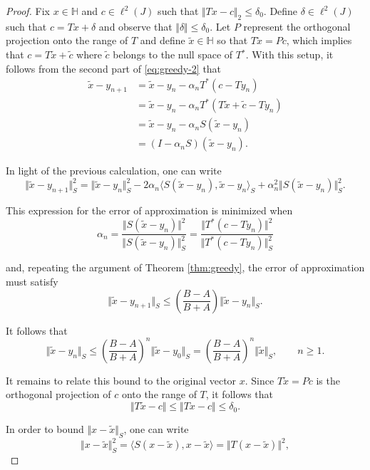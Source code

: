 \documentclass[11pt]{amsart}
\newcounter{Theorem}
\numberwithin{Theorem}{section}
\theoremstyle{definition}
\begin{document}
\begin{proof}
Fix $x\in \mathbb{H}$ and $c\in \ell^{2}(J)$ such that $\Vert Tx-c\Vert_{2} \le \delta_{0}$.  Define $\delta \in \ell^{2}(J)$ such that $c = Tx + \delta$ and observe that $\Vert \delta\Vert \le \delta_{0}$.  Let $P$ represent the orthogonal projection onto the range of $T$ and define $\tilde{x} \in \mathbb{H}$ so that $T\tilde{x}=Pc$, which implies that $c = T\tilde{x} + \tilde{c}$ where $\tilde{c}$ belongs to the null space of $T{^*}$.  With this setup, it follows from the second part of \eqref{eq:greedy-2} that
$$ \begin{aligned} 
    \tilde{x} - y_{n+1} &= \tilde{x} - y_{n} - \alpha_{n} T^{*}(c-T y_{n}) \\
                        &= \tilde{x} - y_{n} - \alpha_{n} T^{*}(T\tilde{x} + \tilde{c} - T y_{n}) \\
                        &= \tilde{x} - y_{n} - \alpha_{n} S(\tilde{x}-y_{n}) \\
                        &= (I-\alpha_{n}S) (\tilde{x}-y_{n}). 
    \end{aligned} $$

\noindent
In light of the previous calculation, one can write
$$ \Vert \tilde{x}-y_{n+1} \Vert_{S}^{2} = \Vert \tilde{x}-y_{n} \Vert_{S}^{2} - 2\alpha_{n} \langle S(\tilde{x}-y_{n}),\tilde{x}-y_{n}\rangle_{S} + \alpha_{n}^{2} \Vert S(\tilde{x}-y_{n}) \Vert_{S}^{2}. $$

\noindent
This expression for the error of approximation is minimized when
$$ \alpha_{n} = \frac{\Vert S(\tilde{x}-y_{n})\Vert^{2}}{\Vert S(\tilde{x}-y_{n})\Vert_{S}^{2}} = \frac{\Vert T^{*}(c-Ty_{n})\Vert^{2}}{\Vert T^{*}(c-Ty_{n})\Vert_{S}^{2}}$$

\noindent
and, repeating the argument of Theorem \ref{thm:greedy}, the error of approximation must satisfy
$$ \Vert \tilde{x}-y_{n+1} \Vert_{S} \le \left ( \frac{B-A}{B+A} \right ) \Vert \tilde{x}-y_{n} \Vert_{S}.$$

\noindent
It follows that
$$ \Vert \tilde{x}-y_{n} \Vert_{S} \le \left ( \frac{B-A}{B+A} \right )^{n} \Vert \tilde{x}-y_{0} \Vert_{S} = \left ( \frac{B-A}{B+A} \right )^{n} \Vert \tilde{x} \Vert_{S}, \qquad n \ge 1.$$

\noindent
It remains to relate this bound to the original vector $x$.  Since $T\tilde{x}=Pc$ is the orthogonal projection of $c$ onto the range of $T$, it follows that
$$ \Vert T\tilde{x} - c \Vert \le \Vert Tx - c \Vert \le \delta_{0}. $$

\noindent
In order to bound $\Vert x-\tilde{x}\Vert_{S}$, one can write
$$ \Vert x-\tilde{x} \Vert_{S}^{2} = \langle  S(x-\tilde{x}),  x-\tilde{x} \rangle = \Vert T(x-\tilde{x})\Vert^{2}, $$


\end{proof}
\end{document}
